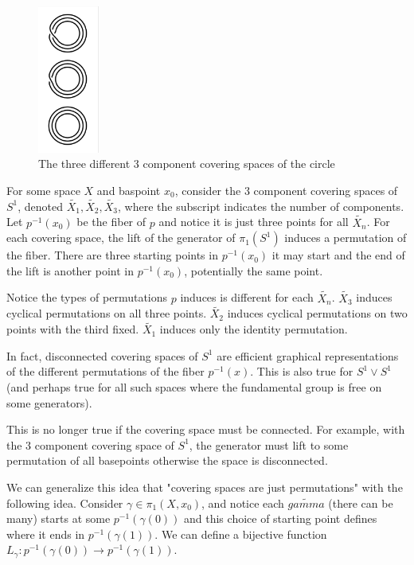 \documentclass[10pt]{article}
\begin{document}
\begin{figure}[ht!]
\centering
\includegraphics[width=20mm]{3-component-covering-spaces-of-s1.png}
\caption{The three different 3 component covering spaces of the circle}
\end{figure}

\begin{note}
	For some space $X$ and baspoint $x_0$, consider the 3 component covering
	spaces of $S^1$, denoted $\tilde{X_1}, \tilde{X_2}, \tilde{X_3}$, where the
	subscript indicates the number of components. Let $p^{-1}(x_0)$ be the fiber
	of $p$ and notice it is just three points for all $\tilde{X_n}$. For each
	covering space, the lift of the generator of $\pi_1(S^1)$ induces a
	permutation of the fiber. There are three starting points in $p^{-1}(x_0)$ it
	may start and the end of the lift is another point in $p^{-1}(x_0)$,
	potentially the same point.

	Notice the types of permutations $p$ induces is different for each
	$\tilde{X_n}$. $\tilde{X_3}$ induces cyclical permutations on all three points.
	$\tilde{X_2}$ induces cyclical permutations on two points with the third
	fixed. $\tilde{X_1}$ induces only the identity permutation.
\end{note}

In fact, disconnected covering spaces of $S^1$ are efficient graphical
representations of the different permutations of the fiber $p^{-1}(x)$.
This is also true for $S^1 \vee S^1$ (and perhaps true for all such spaces
where the fundamental group is free on some generators). 

This is no longer true if the covering space must be connected. For example,
with the 3 component covering space of $S^1$, the generator must lift to some
permutation of all basepoints otherwise the space is disconnected.

We can generalize this idea that "covering spaces are just permutations" with
the following idea. Consider $\gamma \in \pi_1(X, x_0)$, and notice each
$\tilde{gamma}$ (there can be many) starts at some $p^{-1}(\gamma(0))$ and this
choice of starting point defines where it ends in $p^{-1}(\gamma(1))$. We can
define a bijective function $L_{\gamma}: p^{-1}(\gamma(0)) \to p^{-1}(\gamma(1))$.
\end{document}

